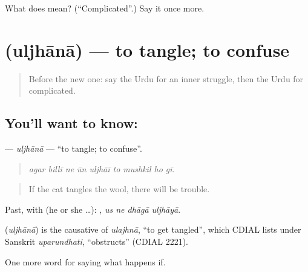 \begin{tcolorbox}[breakable,colback=teal!4,colframe=teal!35!black,title={Before you move on}]
What does  mean? (\textquotedblleft{}Complicated\textquotedblright{}.) Say it once more.
\end{tcolorbox}
\section[\texorpdfstring{\ur{الجھانا} (uljhānā)}{الجھانا (uljhānā)}]{ (uljhānā) — to tangle; to confuse}

\label{lesson:UR-C529-uljhana}



\begin{quote}
Before the new one: say the Urdu for an inner struggle, then the Urdu for complicated.
\end{quote}

\subsection*{You'll want to know: }
\textbf{} — \emph{uljhānā} — \textquotedblleft{}to tangle; to confuse\textquotedblright{}.

\begin{quote}
        
\end{quote}

\begin{quote}
\emph{agar billī ne ūn uljhāī to mushkil ho gī.}
\end{quote}

\begin{quote}
If the cat tangles the wool, there will be trouble.
\end{quote}

Past, with  (he or she …):    , \emph{us ne dhāgā uljhāyā}.

\begin{cousinweb}
\textbf{} (\emph{uljhānā}) is the causative of \emph{ulajhnā}, \textquotedblleft{}to get tangled\textquotedblright{}, which CDIAL lists under Sanskrit \emph{uparundhati}, \textquotedblleft{}obstructs\textquotedblright{} (CDIAL 2221).
\end{cousinweb}

\begin{grammarlens}[title={What you've built}]
One more word for saying what happens if.
\end{grammarlens}


